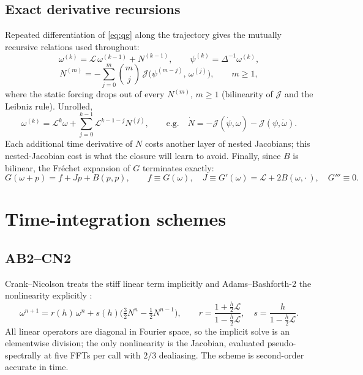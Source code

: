 \documentclass[11pt]{article}
\theoremstyle{plain}
\theoremstyle{definition}
\newcommand{\Lop}{\mathcal{L}}
\newcommand{\Jop}{\mathcal{J}}
\newcommand{\Ndot}{\dot{N}}
\begin{document}
\subsection{Exact derivative recursions}
\label{sec:recursions}
Repeated differentiation of \eqref{eq:qg} along the trajectory gives the
mutually recursive relations used throughout:
\begin{equation}
\omega^{(k)} = \Lop\,\omega^{(k-1)} + N^{(k-1)},\qquad
\psi^{(k)}=\Delta^{-1}\omega^{(k)},
\label{eq:wk}
\end{equation}
\begin{equation}
N^{(m)} = -\sum_{j=0}^{m}\binom{m}{j}\,
\Jop\!\big(\psi^{(m-j)},\,\omega^{(j)}\big),\qquad m\ge1,
\label{eq:leibniz}
\end{equation}
where the static forcing drops out of every $N^{(m)}$, $m\ge1$ (bilinearity of
$\Jop$ and the Leibniz rule). Unrolled,
\begin{equation}
\omega^{(k)} = \Lop^k\omega+\sum_{j=0}^{k-1}\Lop^{k-1-j}N^{(j)},\qquad
\text{e.g.}\quad
\Ndot=-\Jop(\dot\psi,\omega)-\Jop(\psi,\dot\omega).
\label{eq:wk-unrolled}
\end{equation}
Each additional time derivative of $N$ costs another layer of nested
Jacobians; this nested-Jacobian cost is what the closure will learn to avoid.
Finally, since $B$ is bilinear, the Fr\'echet expansion of $G$ terminates
exactly:
\begin{equation}
G(\omega+p)=f+Jp+B(p,p),\qquad
f\equiv G(\omega),\quad
J\equiv G'(\omega)=\Lop+2B(\omega,\cdot\,),\quad
G'''\equiv0.
\label{eq:frechet}
\end{equation}

\section{Time-integration schemes}
\label{sec:schemes}

\subsection{AB2--CN2}
\label{sec:ab2cn2}
Crank--Nicolson treats the stiff linear term implicitly and
Adams--Bashforth-2 the nonlinearity explicitly \citep{ascher1995,frank1997}:
\begin{equation}
\omega^{n+1}=r(h)\,\omega^n+s(h)\Big(\tfrac32 N^n-\tfrac12 N^{n-1}\Big),\qquad
r=\frac{1+\tfrac h2\Lop}{1-\tfrac h2\Lop},\quad s=\frac{h}{1-\tfrac h2\Lop}.
\label{eq:ab2cn2}
\end{equation}
All linear operators are diagonal in Fourier space, so the implicit solve is
an elementwise division; the only nonlinearity is the Jacobian, evaluated
pseudo-spectrally at five FFTs per call with $2/3$ dealiasing. The scheme is
second-order accurate in time.
\end{document}
